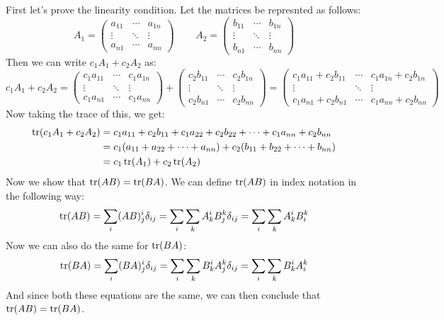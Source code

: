 \documentclass{article}
\begin{document}
\begin{solution}
	First let's prove the linearity condition. Let the matrices be represnted as follows: 
	\[
		A_1 = \begin{pmatrix} a_{11} & \cdots & a_{1n}\\ \vdots & \ddots & \vdots\\ a_{n 1} & \cdots &  a_{nn}
			\end{pmatrix} \phantom{aaaa} 
			A_2 = \begin{pmatrix} b_{11}& \cdots & b_{1n}\\ \vdots & \ddots & \vdots\\ b_{n 1} & \cdots & b_{nn} 
			\end{pmatrix} 
	\]
	Then we can write $c_1A_1 + c_2A_2$ as:
	\[
	c_1A_1 + c_2A_2 =\begin{pmatrix} c_1a_{11} & \cdots & c_1a_{1n}\\ \vdots & \ddots & \vdots\\ 
		c_1 a_{n 1} & \cdots & c_1 a_{nn}
			\end{pmatrix}  + \begin{pmatrix} c_2b_{11}& \cdots & c_2b_{1n}\\ \vdots & \ddots & \vdots\\ c_2 b_{n 1} & \cdots &c_2 b_{nn} 
			\end{pmatrix}  = 
		\begin{pmatrix} c_1a_{11} + c_2b_{11} & \cdots & c_1a_{1n} + c_2b_{1n}\\
		\vdots & \ddots & \vdots \\
	c_1a_{n 1} + c_2b_{n 1} & \cdots & c_1 a_{nn} + c_2 b_{nn}\end{pmatrix} 
	\] 
	Now taking the trace of this, we get: 
	\begin{align*}
		\operatorname{tr}(c_1A_1 + c_2A_2) &= c_1a_{11} + c_2b_{11} + c_1a_{22} + c_2b_{22} + \dots + c_1a_{nn} + c_2b_{nn}\\
							 &= c_1(a_{11} + a_{22} + \dots + a_{nn}) + c_2(b_{11} + b_{22} + \dots + b_{nn})\\
							 &= c_1\operatorname{tr}(A_1) + c_2\operatorname{tr}(A_2)
	\end{align*} 
	Now we show that $\operatorname{tr}(AB) = \operatorname{tr}(BA)$. We can define $\operatorname{tr}(AB)$ in index notation in the following way: 
	\[
		\operatorname{tr}(AB) = \sum_i(AB)^i_j \delta_{ij} = \sum_i \sum_k A^i_k B^k_j \delta_{ij} = \sum_i \sum_k A^i_k 
		B^k_i
	\] 
	Now we can also do the same for $\operatorname{tr}(BA)$:
	\[
		\operatorname{tr}(BA) = \sum_i (BA)^i_j \delta_{ij} = \sum_i \sum_k B^i_k A^k_j \delta_{ij} = \sum_i \sum_k B^i_k A^k_i
	\] 
	And since both these equations are the same, we can then conclude that $\operatorname{tr}(AB) = \operatorname{tr}(BA)$. 
\end{solution}
\end{document}
